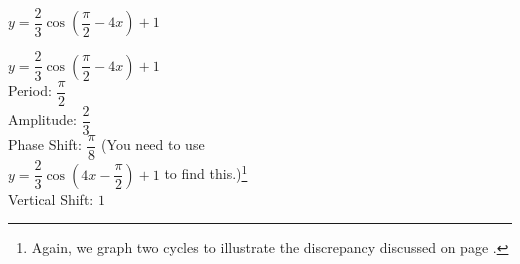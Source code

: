 {$y = \dfrac{2}{3} \cos \left( \dfrac{\pi}{2} - 4x \right) + 1$}
{$y = \dfrac{2}{3} \cos \left( \dfrac{\pi}{2} - 4x \right) + 1$\\ 
Period: $\dfrac{\pi}{2}$\\
Amplitude: $\dfrac{2}{3}$\\ 
Phase Shift: $\dfrac{\pi}{8}$ (You need to use \\
$y = \dfrac{2}{3} \cos \left( 4x - \dfrac{\pi}{2} \right) + 1$ to find this.)\footnote{Again, we graph two cycles to illustrate the discrepancy discussed on page \pageref{phaseshiftissue}.}\\
Vertical Shift: $1$

\begin{center}
\end{center}
}
